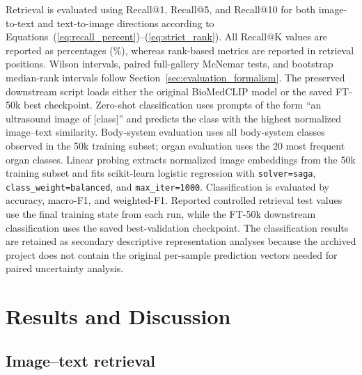 \documentclass[runningheads]{llncs}
\begin{document}
Retrieval is evaluated using Recall@1, Recall@5, and Recall@10 for both image-to-text and text-to-image directions according to Equations~(\ref{eq:recall_percent})--(\ref{eq:strict_rank}). All Recall@K values are reported as percentages (\%), whereas rank-based metrics are reported in retrieval positions. Wilson intervals, paired full-gallery McNemar tests, and bootstrap median-rank intervals follow Section~\ref{sec:evaluation_formalism}. The preserved downstream script loads either the original BioMedCLIP model or the saved FT-50k best checkpoint. Zero-shot classification uses prompts of the form ``an ultrasound image of [class]'' and predicts the class with the highest normalized image--text similarity. Body-system evaluation uses all body-system classes observed in the 50k training subset; organ evaluation uses the 20 most frequent organ classes. Linear probing extracts normalized image embeddings from the 50k training subset and fits scikit-learn logistic regression with \texttt{solver=saga}, \texttt{class\_weight=balanced}, and \texttt{max\_iter=1000}. Classification is evaluated by accuracy, macro-F1, and weighted-F1. Reported controlled retrieval test values use the final training state from each run, while the FT-50k downstream classification uses the saved best-validation checkpoint. The classification results are retained as secondary descriptive representation analyses because the archived project does not contain the original per-sample prediction vectors needed for paired uncertainty analysis.

\section{Results and Discussion}
\subsection{Image--text retrieval}
\end{document}
